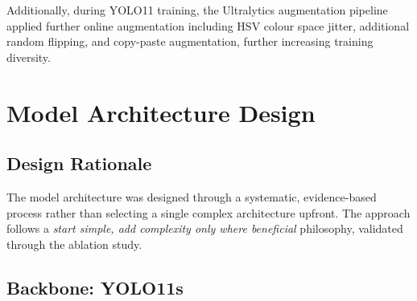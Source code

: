\begin{table}[H]
\centering
\caption{Augmentation Pipeline Parameters}
\label{tab:augmentation}
\end{table}

Additionally, during YOLO11 training, the Ultralytics augmentation pipeline applied further online augmentation including HSV colour space jitter, additional random flipping, and copy-paste augmentation, further increasing training diversity.

\section{Model Architecture Design}

\subsection{Design Rationale}

The model architecture was designed through a systematic, evidence-based process rather than selecting a single complex architecture upfront. The approach follows a \textit{start simple, add complexity only where beneficial} philosophy, validated through the ablation study.

\subsection{Backbone: YOLO11s}

